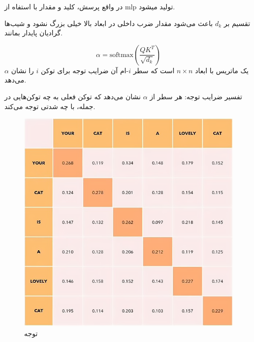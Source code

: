 در واقع پرسش، کلید و مقدار با استفاه از mlp  تولید میشود.



تقسیم بر \( d_k \) باعث می‌شود مقدار ضرب داخلی در ابعاد بالا خیلی بزرگ نشود و شیب‌ها گرادیان پایدار بمانند.

\begin{equation}
	\alpha = \text{softmax}\left( \frac{QK^T}{\sqrt{d_k}} \right)
	\label{eq:alpha}
\end{equation}
\(\alpha\) یک ماتریس با ابعاد \( n \times n \) است که سطر \( i \)-ام آن ضرایب توجه برای توکن \( i \) را نشان می‌دهد.

تفسیر ضرایب توجه: هر سطر از \( \alpha \) نشان می‌دهد که توکن فعلی به چه توکن‌هایی در جمله، با چه شدتی توجه می‌کند.



\begin{figure}[h]
	\centering
	\begin{minipage}[b]{0.6\textwidth}
		\centering
		\includegraphics[width=\textwidth]{transformer_images/multi_head_attention_new.png}
		\caption{توجه}
		\label{fig:attention}
	\end{minipage}
	\hfill
	
\end{figure}











